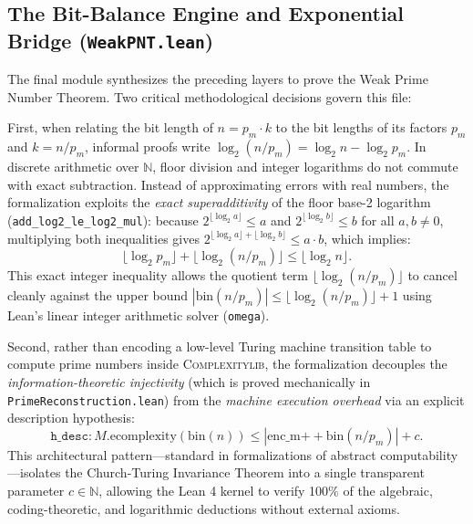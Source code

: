 \documentclass[acmsmall,natbib=false,nonacm]{acmart}
\begin{document}
\subsection{The Bit-Balance Engine and Exponential Bridge (\texttt{WeakPNT.lean})}
The final module synthesizes the preceding layers to prove the Weak Prime Number Theorem. Two critical methodological decisions govern this file:

First, when relating the bit length of $n = p_m \cdot k$ to the bit lengths of its factors $p_m$ and $k = n / p_m$, informal proofs write $\log_2(n / p_m) = \log_2 n - \log_2 p_m$. In discrete arithmetic over $\mathbb{N}$, floor division and integer logarithms do not commute with exact subtraction. Instead of approximating errors with real numbers, the formalization exploits the \textit{exact superadditivity} of the floor base-2 logarithm (\texttt{add\_log2\_le\_log2\_mul}): because $2^{\lfloor\log_2 a\rfloor} \le a$ and $2^{\lfloor\log_2 b\rfloor} \le b$ for all $a, b \neq 0$, multiplying both inequalities gives $2^{\lfloor\log_2 a\rfloor + \lfloor\log_2 b\rfloor} \le a \cdot b$, which implies:
\begin{equation}
    \label{eq:log2_superadditivity}
    \lfloor\log_2 p_m\rfloor + \lfloor\log_2 (n / p_m)\rfloor \le \lfloor\log_2 n\rfloor.
\end{equation}
This exact integer inequality allows the quotient term $\lfloor\log_2 (n / p_m)\rfloor$ to cancel cleanly against the upper bound $|\text{bin}(n / p_m)| \le \lfloor\log_2 (n / p_m)\rfloor + 1$ using Lean's linear integer arithmetic solver (\texttt{omega}).

Second, rather than encoding a low-level Turing machine transition table to compute prime numbers inside \textsc{Complexitylib}, the formalization decouples the \textit{information-theoretic injectivity} (which is proved mechanically in \texttt{PrimeReconstruction.lean}) from the \textit{machine execution overhead} via an explicit description hypothesis:
\begin{equation}
    \texttt{h\_desc} : M.\text{ecomplexity}(\text{bin}(n)) \le |\text{enc\_m} \mathbin{+\!+} \text{bin}(n / p_m)| + c.
\end{equation}
This architectural pattern—standard in formalizations of abstract computability—isolates the Church-Turing Invariance Theorem into a single transparent parameter $c \in \mathbb{N}$, allowing the Lean 4 kernel to verify 100\% of the algebraic, coding-theoretic, and logarithmic deductions without external axioms.
\end{document}
